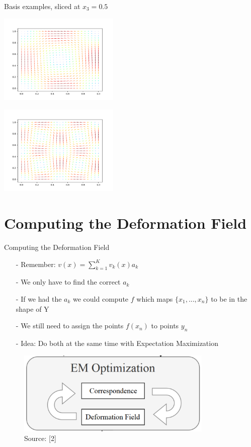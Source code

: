 \documentclass[xcolor=dvipsnames]{beamer}
\begin{document}
\begin{frame}{Basis examples, sliced at $x_3=0.5$}
\begin{minipage}{.5\textwidth}
  \centering
  \includegraphics[height=4.3cm]{Pictures/basis1.png}
  \label{fig:test1}
\end{minipage}%
\begin{minipage}{.5\textwidth}
  \centering
  \includegraphics[height=4.3cm]{Pictures/basis2.png}
  \label{fig:test2}
\end{minipage}
\end{frame}

\section{Computing the Deformation Field}
\begin{frame}{Computing the Deformation Field}
\begin{enumerate}
\item[-] Remember: $v(x) = \sum_{k=1}^K v_k(x)a_k$
\item[-] We only have to find the correct $a_k$
\item[-] If we had the $a_k$ we could compute $f$ which maps $\{x_1,...,x_n\}$ to be in the shape of Y
\item[-] We still need to assign the points $f(x_n)$ to points $y_n$
\pause
\item[-] Idea: Do both at the same time with Expectation Maximization
\end{enumerate}
\begin{figure}
\includegraphics[height=4cm]{Pictures/Pipeline.png}
\caption*{Source: [2]}
\end{figure}
\end{frame}
\end{document}
